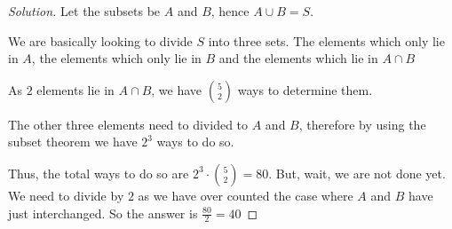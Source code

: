\begin{proof}
    [Solution]
    Let the subsets be $A$ and $B$, hence $A \cup B = S$.\par
    We are basically looking to divide $S$ into three sets. The elements which only 
    lie in $A$, the elements which only lie in $B$ and the elements which lie in $A \cap B$\par
    As $2$ elements lie in $A \cap B$, we have $\binom{5}{2}$ ways to determine them.\par
    The other three elements need to divided to $A$ and $B$, therefore by using the 
    subset theorem we have $2^3$ ways to do so.\par
    Thus, the total ways to do so are $2^3 \cdot \binom{5}{2}=80$. But, wait, we 
    are not done yet. We need to divide by $2$ as we have over counted the case where 
    $A$ and $B$ have just interchanged. So the answer is $\frac{80}{2}=\boxed{40}$
\end{proof}
